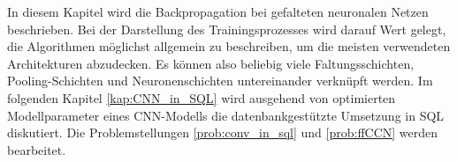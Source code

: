 In diesem Kapitel wird die Backpropagation bei gefalteten neuronalen Netzen beschrieben. Bei der Darstellung des Trainingsprozesses wird darauf Wert gelegt, die Algorithmen möglichst allgemein zu beschreiben, um
die meisten verwendeten Architekturen abzudecken. Es können also beliebig viele Faltungsschichten, Pooling-Schichten und Neuronenschichten untereinander verknüpft werden. Im folgenden Kapitel \ref{kap:CNN_in_SQL} wird ausgehend von optimierten Modellparameter eines CNN-Modells die datenbankgestützte Umsetzung in SQL diskutiert. Die Problemstellungen \ref{prob:conv_in_sql} und \ref{prob:ffCCN} werden bearbeitet. 





